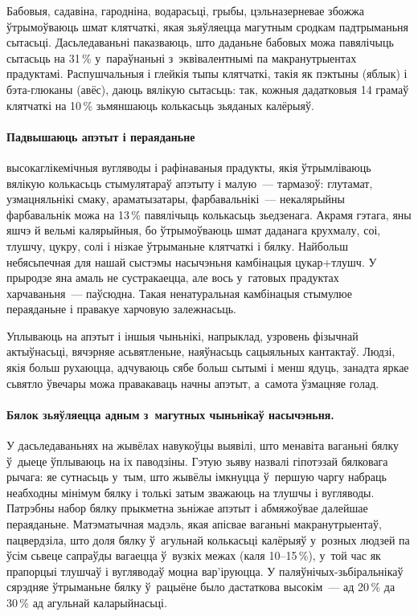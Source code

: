 Бабовыя, садавіна, гародніна, водарасьці, грыбы, цэльназерневае збожжа ўтрымоўваюць шмат клятчаткі, якая зьяўляецца магутным сродкам падтрыманьня сытасьці. Дасьледаваньні паказваюць, што даданьне бабовых можа павялічыць сытасьць на 31\,\% у~параўнаньні з~эквівалентнымі па макранутрыентах прадуктамі. Распушчальныя і глейкія тыпы клятчаткі, такія як пэктыны (яблык) і бэта-глюканы (авёс), даюць вялікую сытасьць: так, кожныя дадатковыя 14 грамаў клятчаткі на 10\,\% зьмяншаюць колькасьць зьяданых калёрыяў.

\paragraph{Падвышаюць апэтыт і пераяданьне} высокаглікемічныя вугляводы і рафінаваныя прадукты, якія ўтрымліваюць вялікую колькасьць стымулятараў апэтыту і малую~--- тармазоў: глутамат, узмацняльнікі смаку, араматызатары, фарбавальнікі~--- некалярыйны фарбавальнік можа на 13\,\% павялічыць колькасьць зьедзенага. Акрамя гэтага, яны яшчэ й вельмі калярыйныя, бо ўтрымоўваюць шмат даданага крухмалу, соі, тлушчу, цукру, солі і нізкае ўтрыманьне клятчаткі і бялку. Найбольш небясьпечная для нашай сыстэмы насычэньня камбінацыя цукар+тлушч. У прыродзе яна амаль не сустракаецца, але вось у~гатовых прадуктах харчаваньня~--- паўсюдна. Такая ненатуральная камбінацыя стымулюе пераяданьне і правакуе харчовую залежнасьць.

Уплываюць на апэтыт і іншыя чыньнікі, напрыклад, узровень фізычнай актыўнасьці, вячэрняе асьвятленьне, наяўнасьць сацыяльных кантактаў. Людзі, якія больш рухаюцца, адчуваюць сябе больш сытымі і менш ядуць, занадта яркае сьвятло ўвечары можа правакаваць начны апэтыт, а~самота ўзмацняе голад.

\paragraph{Бялок зьяўляецца адным з~магутных чыньнікаў насычэньня.} У дасьледаваньнях на жывёлах навукоўцы выявілі, што менавіта ваганьні бялку ў~дыеце ўплываюць на іх паводзіны. Гэтую зьяву назвалі гіпотэзай бялковага рычага: яе сутнасьць у~тым, што жывёлы імкнуцца ў~першую чаргу набраць неабходны мінімум бялку і толькі затым зважаюць на тлушчы і вугляводы. Патрэбны набор бялку прыкметна зьніжае апэтыт і абмяжоўвае далейшае пераяданьне. Матэматычная мадэль, якая апісвае ваганьні макранутрыентаў, пацвердзіла, што доля бялку ў~агульнай колькасьці калёрыяў у~розных людзей па ўсім сьвеце сапраўды вагаецца ў~вузкіх межах (каля 10--15\,\%), у~той час як прапорцыі тлушчаў і вугляводаў моцна вар'іруюцца. У паляўнічых-зьбіральнікаў сярэдняе ўтрыманьне бялку ў~рацыёне было дастаткова высокім~--- ад 20\,\% да 30\,\% ад агульнай каларыйнасьці.

